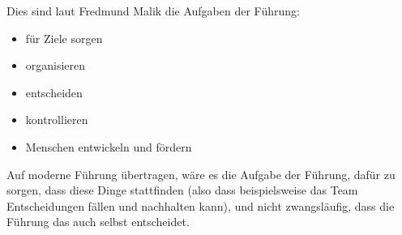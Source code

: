 Dies sind laut Fredmund Malik \cite{malik-fuehrung} die Aufgaben der Führung:

\begin{itemize}
  \item für Ziele sorgen
  \item organisieren
  \item entscheiden
  \item kontrollieren
  \item Menschen entwickeln und fördern
\end{itemize}

Auf moderne Führung übertragen, wäre es die Aufgabe der Führung, dafür zu sorgen, dass diese Dinge stattfinden (also dass beispielsweise das Team Entscheidungen fällen und nachhalten kann), und nicht zwangsläufig, dass die Führung das auch selbst entscheidet.
